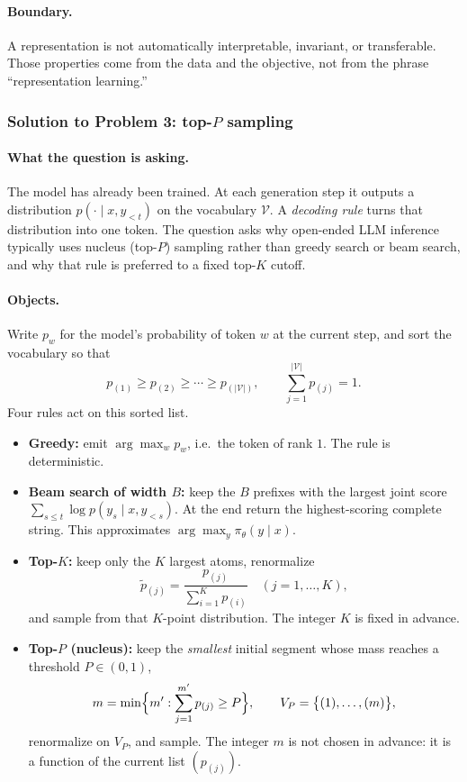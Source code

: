 \documentclass[11pt,a4paper]{article}
\theoremstyle{definition}
\begin{document}
\paragraph{Boundary.}
A representation is not automatically interpretable, invariant, or transferable. Those properties come from the data and the objective, not from the phrase ``representation learning.''

\subsubsection{Solution to Problem 3: top-$P$ sampling}

\paragraph{What the question is asking.}
The model has already been trained. At each generation step it outputs a distribution \(p(\cdot\mid x,y_{<t})\) on the vocabulary \(\mathcal{V}\). A \emph{decoding rule} turns that distribution into one token. The question asks why open-ended LLM inference typically uses nucleus (top-\(P\)) sampling rather than greedy search or beam search, and why that rule is preferred to a fixed top-\(K\) cutoff.

\paragraph{Objects.}
Write \(p_w\) for the model's probability of token \(w\) at the current step, and sort the vocabulary so that
\[
p_{(1)}\ge p_{(2)}\ge\cdots\ge p_{(|\mathcal{V}|)},
\qquad
\sum_{j=1}^{|\mathcal{V}|}p_{(j)}=1.
\]
Four rules act on this sorted list.

\begin{definition}\label{def:spr2025-nlp-decoding}
\begin{itemize}
    \item \textbf{Greedy:} emit \(\arg\max_w p_w\), i.e.\ the token of rank \(1\). The rule is deterministic.
    \item \textbf{Beam search of width \(B\):} keep the \(B\) prefixes with the largest joint score \(\sum_{s\le t}\log p(y_s\mid x,y_{<s})\). At the end return the highest-scoring complete string. This approximates \(\arg\max_y \pi_\theta(y\mid x)\).
    \item \textbf{Top-\(K\):} keep only the \(K\) largest atoms, renormalize
    \[
    \widetilde p_{(j)}=\frac{p_{(j)}}{\sum_{i=1}^{K}p_{(i)}}
    \quad (j=1,\ldots,K),
    \]
    and sample from that \(K\)-point distribution. The integer \(K\) is fixed in advance.
    \item \textbf{Top-\(P\) (nucleus):} keep the \emph{smallest} initial segment whose mass reaches a threshold \(P\in(0,1)\),
    \[
    m=\min\Bigl\{m':\sum_{j=1}^{m'}p_{(j)}\ge P\Bigr\},
    \qquad
    V_P=\bigl\{(1),\ldots,(m)\bigr\},
    \]
    renormalize on \(V_P\), and sample. The integer \(m\) is not chosen in advance: it is a function of the current list \((p_{(j)})\).
\end{itemize}
\end{definition}
\end{document}
